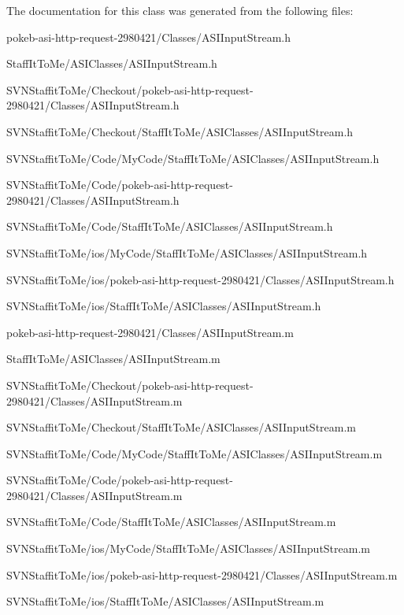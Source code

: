 \-The documentation for this class was generated from the following files\-:\begin{DoxyCompactItemize}
\item 
pokeb-\/asi-\/http-\/request-\/2980421/\-Classes/\-A\-S\-I\-Input\-Stream.\-h\item 
\-Staff\-It\-To\-Me/\-A\-S\-I\-Classes/\-A\-S\-I\-Input\-Stream.\-h\item 
\-S\-V\-N\-Staffit\-To\-Me/\-Checkout/pokeb-\/asi-\/http-\/request-\/2980421/\-Classes/\-A\-S\-I\-Input\-Stream.\-h\item 
\-S\-V\-N\-Staffit\-To\-Me/\-Checkout/\-Staff\-It\-To\-Me/\-A\-S\-I\-Classes/\-A\-S\-I\-Input\-Stream.\-h\item 
\-S\-V\-N\-Staffit\-To\-Me/\-Code/\-My\-Code/\-Staff\-It\-To\-Me/\-A\-S\-I\-Classes/\-A\-S\-I\-Input\-Stream.\-h\item 
\-S\-V\-N\-Staffit\-To\-Me/\-Code/pokeb-\/asi-\/http-\/request-\/2980421/\-Classes/\-A\-S\-I\-Input\-Stream.\-h\item 
\-S\-V\-N\-Staffit\-To\-Me/\-Code/\-Staff\-It\-To\-Me/\-A\-S\-I\-Classes/\-A\-S\-I\-Input\-Stream.\-h\item 
\-S\-V\-N\-Staffit\-To\-Me/ios/\-My\-Code/\-Staff\-It\-To\-Me/\-A\-S\-I\-Classes/\-A\-S\-I\-Input\-Stream.\-h\item 
\-S\-V\-N\-Staffit\-To\-Me/ios/pokeb-\/asi-\/http-\/request-\/2980421/\-Classes/\-A\-S\-I\-Input\-Stream.\-h\item 
\-S\-V\-N\-Staffit\-To\-Me/ios/\-Staff\-It\-To\-Me/\-A\-S\-I\-Classes/\-A\-S\-I\-Input\-Stream.\-h\item 
pokeb-\/asi-\/http-\/request-\/2980421/\-Classes/\-A\-S\-I\-Input\-Stream.\-m\item 
\-Staff\-It\-To\-Me/\-A\-S\-I\-Classes/\-A\-S\-I\-Input\-Stream.\-m\item 
\-S\-V\-N\-Staffit\-To\-Me/\-Checkout/pokeb-\/asi-\/http-\/request-\/2980421/\-Classes/\-A\-S\-I\-Input\-Stream.\-m\item 
\-S\-V\-N\-Staffit\-To\-Me/\-Checkout/\-Staff\-It\-To\-Me/\-A\-S\-I\-Classes/\-A\-S\-I\-Input\-Stream.\-m\item 
\-S\-V\-N\-Staffit\-To\-Me/\-Code/\-My\-Code/\-Staff\-It\-To\-Me/\-A\-S\-I\-Classes/\-A\-S\-I\-Input\-Stream.\-m\item 
\-S\-V\-N\-Staffit\-To\-Me/\-Code/pokeb-\/asi-\/http-\/request-\/2980421/\-Classes/\-A\-S\-I\-Input\-Stream.\-m\item 
\-S\-V\-N\-Staffit\-To\-Me/\-Code/\-Staff\-It\-To\-Me/\-A\-S\-I\-Classes/\-A\-S\-I\-Input\-Stream.\-m\item 
\-S\-V\-N\-Staffit\-To\-Me/ios/\-My\-Code/\-Staff\-It\-To\-Me/\-A\-S\-I\-Classes/\-A\-S\-I\-Input\-Stream.\-m\item 
\-S\-V\-N\-Staffit\-To\-Me/ios/pokeb-\/asi-\/http-\/request-\/2980421/\-Classes/\-A\-S\-I\-Input\-Stream.\-m\item 
\-S\-V\-N\-Staffit\-To\-Me/ios/\-Staff\-It\-To\-Me/\-A\-S\-I\-Classes/\-A\-S\-I\-Input\-Stream.\-m\end{DoxyCompactItemize}
